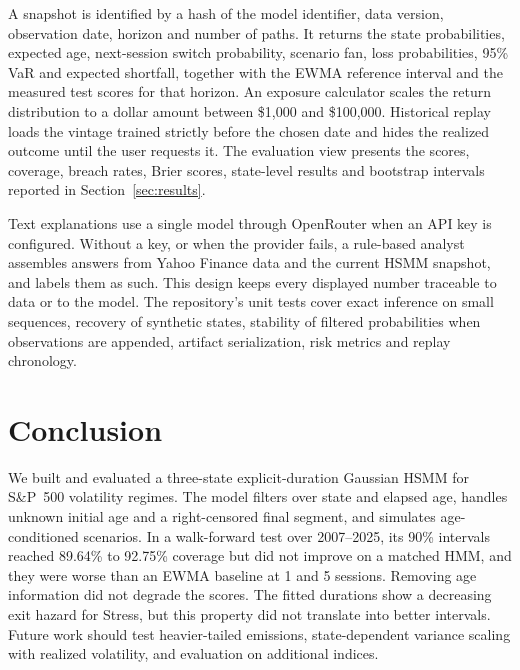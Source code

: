 \documentclass[conference]{IEEEtran}
\begin{document}
A snapshot is identified by a hash of the model identifier, data version, observation date, horizon and number of paths. It returns the state probabilities, expected age, next-session switch probability, scenario fan, loss probabilities, 95\% VaR and expected shortfall, together with the EWMA reference interval and the measured test scores for that horizon. An exposure calculator scales the return distribution to a dollar amount between \$1,000 and \$100,000. Historical replay loads the vintage trained strictly before the chosen date and hides the realized outcome until the user requests it. The evaluation view presents the scores, coverage, breach rates, Brier scores, state-level results and bootstrap intervals reported in Section~\ref{sec:results}.

Text explanations use a single model through OpenRouter when an API key is configured. Without a key, or when the provider fails, a rule-based analyst assembles answers from Yahoo Finance data and the current HSMM snapshot, and labels them as such. This design keeps every displayed number traceable to data or to the model. The repository's unit tests cover exact inference on small sequences, recovery of synthetic states, stability of filtered probabilities when observations are appended, artifact serialization, risk metrics and replay chronology.

\section{Conclusion}
\label{sec:conclusion}
We built and evaluated a three-state explicit-duration Gaussian HSMM for S\&P~500 volatility regimes. The model filters over state and elapsed age, handles unknown initial age and a right-censored final segment, and simulates age-conditioned scenarios. In a walk-forward test over 2007--2025, its 90\% intervals reached 89.64\% to 92.75\% coverage but did not improve on a matched HMM, and they were worse than an EWMA baseline at 1 and 5 sessions. Removing age information did not degrade the scores. The fitted durations show a decreasing exit hazard for Stress, but this property did not translate into better intervals. Future work should test heavier-tailed emissions, state-dependent variance scaling with realized volatility, and evaluation on additional indices.
\end{document}
